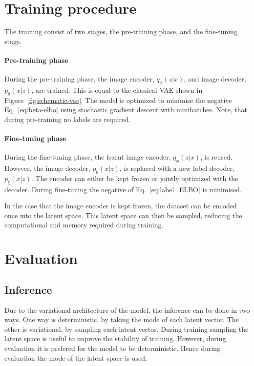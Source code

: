 \section{Training procedure}
The training consist of two stages, the pre-training phase, and the fine-tuning stage. 
\paragraph*{Pre-training phase} During the pre-training phase, the image encoder, $q_\phi(z|x)$, and image decoder, $p_\theta(x|z)$, are trained. This is equal to the classical VAE shown in Figure~\ref{fig:schematic-vae}. The model is optimized to minimise the negative Eq.~\ref{eq:beta-elbo} using stochastic gradient descent with minibatches. Note, that during pre-training no labels are required.

\paragraph*{Fine-tuning phase} During the fine-tuning phase, the learnt image encoder, $q_\phi(z|x)$, is reused. However, the image decoder, $p_\theta(x|z)$, is replaced with a new label decoder, $p_\xi(x|z)$. The encoder can either be kept frozen or jointly optimized with the decoder. During fine-tuning the negative of Eq.~\ref{eq:label_ELBO} is minimised.

In the case that the image encoder is kept frozen, the dataset can be encoded once into the latent space. This latent space can then be sampled, reducing the computational and memory required during training.

\section{Evaluation}
\subsection{Inference}
Due to the variational architecture of the model, the inference can be done in two ways. One way is deterministic, by taking the mode of each latent vector. The other is variational, by sampling each latent vector. During training sampling the latent space is useful to improve the stability of training. However, during evaluation it is prefered for the model to be deterministic. Hence during evaluation the mode of the latent space is used.

